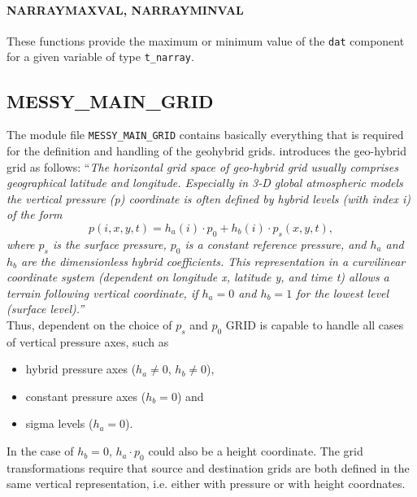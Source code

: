 \documentclass[11pt,twoside]{article}
\begin{document}
\paragraph{NARRAYMAXVAL, NARRAYMINVAL\\\label{NARRVAL}}

These functions provide the maximum or minimum value of the \verb|dat|
component for a given variable of type \verb|t_narray|.
\clearpage
\subsection{MESSY\_MAIN\_GRID\label{MMG}}

The module file \verb|MESSY_MAIN_GRID| contains basically everything that
is required for the definition and handling of the geohybrid grids.
\cite{Joeckel06a} introduces the geo-hybrid grid as follows:
``{\it The horizontal grid space of geo-hybrid grid usually comprises geographical latitude and longitude. Especially in 3-D global atmospheric models the vertical pressure (p) coordinate is often defined by hybrid levels (with index
i) of the form 
\begin{equation}  
p(i, x, y, t) = h_a (i) \cdot p_0 + h_b (i) \cdot p_s (x, y, t) ,
\end{equation}
where $p_s$ is the surface pressure, $p_0$ is a constant reference
pressure, and $h_a$ and $h_b$ are the dimensionless hybrid coefficients. This representation in a curvilinear coordinate system
(dependent on longitude x, latitude y, and time t) allows a
terrain following vertical coordinate, if $h_a = 0$ and $h_b = 1$ for
the lowest level (surface level).''}\\
Thus, dependent on the choice of  $p_s$ and $p_0$ GRID is capable to handle all cases of vertical pressure axes, such as  
\begin{itemize}
\item hybrid pressure axes ($h_a \ne 0$, $h_b \ne 0$),
\item constant pressure axes ($h_b = 0$) and
\item sigma levels ($h_a = 0$).
\end{itemize}
In the case of $h_b = 0$, $h_a \cdot p_0$ could also be a height coordinate.
 The grid transformations require that source and destination grids 
 are both defined in the same vertical representation, i.e. either
 with pressure or with height coordnates.
\end{document}
